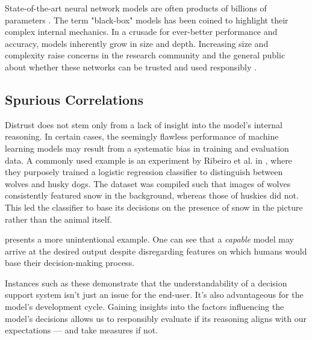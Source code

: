 State-of-the-art neural network models are often products of billions of parameters \cite{arrieta-taxonomy}.
The term "black-box" models has been coined to highlight their complex internal mechanics.
In a crusade for ever-better performance and accuracy, models inherently grow in size and depth.
Increasing size and complexity raise concerns in the research community and the general public about whether these networks can be trusted and used responsibly \cite{arrieta-taxonomy, xai-survey}.

\subsection*{Spurious Correlations}

Distrust does not stem only from a lack of insight into the model's internal reasoning.
In certain cases, the seemingly flawless performance of machine learning models may result from a systematic bias in training and evaluation data.
A commonly used example is an experiment by Ribeiro et al. in \cite{xai-husky}, where they purposely trained a logistic regression classifier to distinguish between wolves and husky dogs.
The dataset was compiled such that images of wolves consistently featured snow in the background, whereas those of huskies did not.
This led the classifier to base its decisions on the presence of snow in the picture rather than the animal itself. 

 presents a more unintentional example.
One can see that a \emph{capable} model may arrive at the desired output despite disregarding features on which humans would base their decision-making process. 

Instances such as these demonstrate that the understandability of a decision support system isn't just an issue for the end-user.
It's also advantageous for the model's development cycle.
Gaining insights into the factors influencing the model's decisions allows us to responsibly evaluate if its reasoning aligns with our expectations --- and take measures if not.

